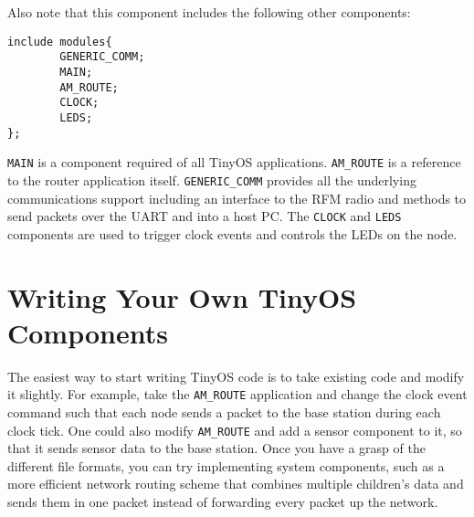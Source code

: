 \documentclass[12pt]{article}
\begin{document}
Also note that this component includes the following other components:

\begin{verbatim}
include modules{
        GENERIC_COMM;
        MAIN;
        AM_ROUTE;
        CLOCK;
        LEDS;
};
\end{verbatim}

{\tt MAIN} is a component required of all TinyOS applications.  {\tt AM\_ROUTE}
is a reference to the router application itself.  {\tt GENERIC\_COMM} provides
all the underlying communications support including an interface to the RFM
radio and methods to send packets over the UART and into a host PC.
The {\tt CLOCK} and {\tt LEDS} components are used to trigger clock events
and controls the LEDs on the node.

\section*{Writing Your Own TinyOS Components}

The easiest way to start writing TinyOS code is to take existing code
and modify it slightly. For example, take the {\tt AM\_ROUTE} application
and change the clock event command such that each node sends a packet
to the base station during each clock tick.  One could also modify 
{\tt AM\_ROUTE} and add a sensor component to it, 
so that it sends sensor data to the base station. Once you have a grasp of the
different file formats, you can try implementing system components,
such as a more efficient network routing scheme that combines multiple
children's data and sends them in one packet instead of forwarding
every packet up the network.
\end{document}
